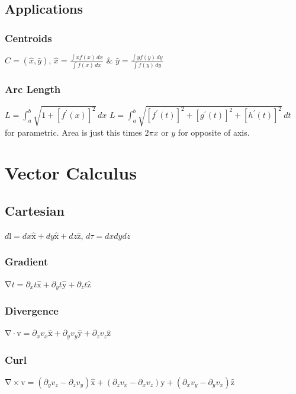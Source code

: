 \documentclass[10pt,landscape,letterpaper]{cheatsheet}
\newcommand{\bv}[1]{\bm{\mathrm{#1}}}
\newcommand{\uv}[1]{\hat{\bv{{#1}}}}
\newcommand{\ux}{\uv{x}}
\newcommand{\uy}{\uv{y}}
\newcommand{\uz}{\uv{z}}
\newcommand{\grad}{\bv{\nabla}}
\begin{document}
\subsection*{Applications}
\subsubsection*{Centroids}
$C = (\hat{x}, \hat{y})$,
$\hat{x} = \frac{\int xf(x) \,dx}{\int f(x) \,dx}$ \&
$\hat{y} = \frac{\int yf(y) \,dy}{\int f(y) \,dy}$
\subsubsection*{Arc Length}
$L = \int_{a}^{b} \sqrt{1+[f^{\prime}(x)]^2} \,dx$
$L = \int_{a}^{b} \sqrt{[f^{\prime}(t)]^2+[g^{\prime}(t)]^2+[h^{\prime}(t)]^2} \,dt$ for parametric. Area is just this times $2\pi x$ or $y$ for opposite of axis.
\section*{Vector Calculus}
\subsection*{Cartesian}
$d\bv{l}=dx\ux+dy\ux+dz\uz$, $d\tau=dxdydz$\\
\subsubsection*{Gradient}
$
        \grad t =\partial_xt\ux+\partial_yt\uy+\partial_zt\uz
$
\subsubsection*{Divergence}
$
        \grad\cdot \bv{v}=\partial_x v_x\ux+\partial_yv_y\uy+\partial_zv_z\uz
$
\subsubsection*{Curl}
$
        \grad\times \bv{v} =\left(\partial_y v_z-\partial_z v_y\right)\ux 
                            +\left(\partial_zv_x-\partial_x v_z\right)\uy  
                            +\left(\partial_xv_y-\partial_yv_x\right)\uz
$
\end{document}
